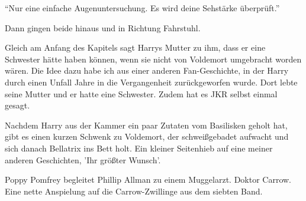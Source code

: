 \enquote{Nur eine einfache Augenuntersuchung. Es wird deine Sehstärke überprüft.}

Dann gingen beide hinaus und in Richtung Fahrstuhl.




\begin{kommentar}
Gleich am Anfang des Kapitels sagt Harrys Mutter zu ihm, dass er eine Schwester hätte haben können, wenn sie nicht von Voldemort umgebracht worden wären. Die Idee dazu habe ich aus einer anderen Fan-Geschichte, in der Harry durch einen Unfall Jahre in die Vergangenheit zurückgeworfen wurde. Dort lebte seine Mutter und er hatte eine Schwester. Zudem hat es JKR selbst einmal gesagt.
\end{kommentar}

\begin{kommentar}
Nachdem Harry aus der Kammer ein paar Zutaten vom Basilisken geholt hat, gibt es einen kurzen Schwenk zu Voldemort, der schweißgebadet aufwacht und sich danach Bellatrix ins Bett holt. Ein kleiner Seitenhieb auf eine meiner anderen Geschichten, 'Ihr größter Wunsch'.
\end{kommentar}

\begin{kommentar}
Poppy Pomfrey begleitet Phillip Allman zu einem Muggelarzt. Doktor Carrow. Eine nette Anspielung auf die Carrow-Zwillinge aus dem siebten Band.
\end{kommentar}
